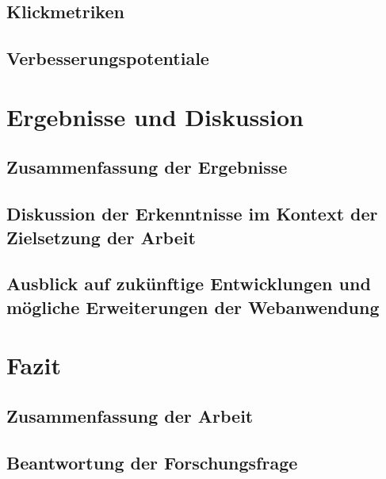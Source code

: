 \documentclass[fontsize=12pt,openright,oneside,paper=a4,BCOR=1cm]{scrbook}
\begin{document}

\section{Klickmetriken}

\section{Verbesserungspotentiale}

%
%

\renewcommand{\cleardoublepage}{}
\chapter{Ergebnisse und Diskussion}

\section{Zusammenfassung der Ergebnisse}

\section{Diskussion der Erkenntnisse im Kontext der Zielsetzung der Arbeit}

\section{Ausblick auf zukünftige Entwicklungen und mögliche Erweiterungen der Webanwendung}

%
%

\renewcommand{\cleardoublepage}{}
\chapter{Fazit}

\section{Zusammenfassung der Arbeit}

\section{Beantwortung der Forschungsfrage}
\end{document}
